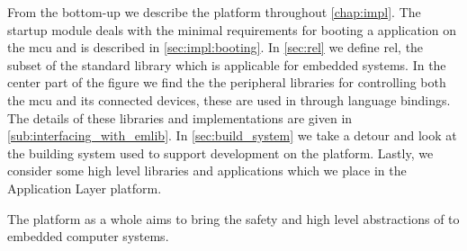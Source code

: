 From the bottom-up we describe the platform throughout \autoref{chap:impl}.
The startup module deals with the minimal requirements for booting a {\rust} application on the \gls{mcu} and is described in \autoref{sec:impl:booting}.
In \autoref{sec:rel} we define \gls{rel}, the subset of the standard library which is applicable for embedded systems.
In the center part of the figure we find the the peripheral libraries for controlling both the \gls{mcu} and its connected devices, these are used in {\rust} through language bindings.
The details of these libraries and implementations are given in \autoref{sub:interfacing_with_emlib}.
In \autoref{sec:build_system} we take a detour and look at the building system used to support development on the {\rg} platform.
Lastly, we consider some high level libraries and applications which we place in the Application Layer platform.

The {\rg} platform as a whole aims to bring the safety and high level abstractions of {\rust} to embedded computer systems.
